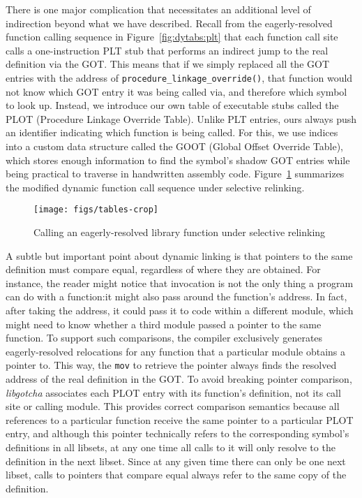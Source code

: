 There is one major complication that necessitates an additional level of indirection
beyond what we have described.  Recall from the eagerly-resolved function calling
sequence in Figure~\ref{fig:dytabs:plt} that each function call site calls a
one-instruction PLT stub that performs an indirect jump to the real definition via
the GOT.  This means that if we simply replaced all the GOT entries with the address
of \texttt{procedure\_linkage\_override()}, that function would not know which GOT
entry it was being called via, and therefore which symbol to look up.  Instead, we
introduce our own table of executable stubs called the PLOT (Procedure Linkage
Override Table).  Unlike PLT entries, ours always push an identifier indicating which
function is being called.  For this, we use indices into a custom data structure
called the GOOT (Global Offset Override Table), which stores enough information to
find the symbol's shadow GOT entries while being practical to traverse in handwritten
assembly code.  Figure~\ref{fig:override} summarizes the modified dynamic function
call sequence under selective relinking.

\begin{figure}
\texttt{[image: figs/tables-crop]}
\caption{Calling an eagerly-resolved library function under selective relinking}
\label{fig:override}
\end{figure}

A subtle but important point about dynamic linking is that pointers to the same
definition must compare equal, regardless of where they are obtained.  For instance,
the reader might notice that invocation is not the only thing a program can do with a
function:\@ it might also pass around the function's address.  In fact, after taking
the address, it could pass it to code within a different module, which might need to
know whether a third module passed a pointer to the same function.  To support such
comparisons, the compiler exclusively generates eagerly-resolved relocations for any
function that a particular module obtains a pointer to.  This way, the \texttt{mov}
to retrieve the pointer always finds the resolved address of the real definition in
the GOT.  To avoid breaking pointer comparison, \textit{libgotcha} associates each
PLOT entry with its function's definition, not its call site or calling module.  This
provides correct comparison semantics because all references to a particular function
receive the same pointer to a particular PLOT entry, and although this pointer
technically refers to the corresponding symbol's definitions in all libsets, at any
one time all calls to it will only resolve to the definition in the next libset.
Since at any given time there can only be one next libset, calls to pointers that
compare equal always refer to the same copy of the definition.

